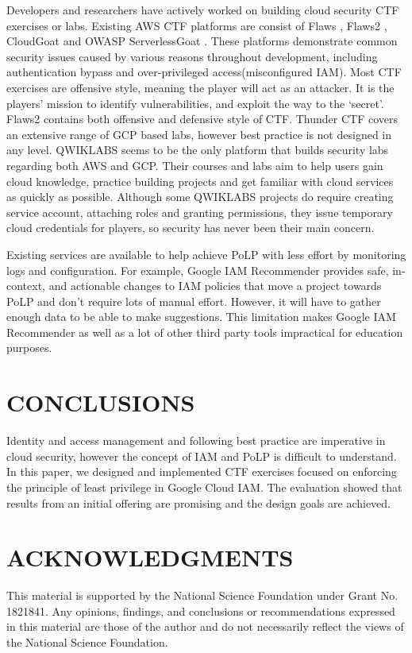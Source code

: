 \documentclass[a4paper,twoside]{article}
\begin{document}
\noindent Developers and researchers have actively worked on building cloud security CTF exercises or labs. Existing AWS CTF platforms are consist of  Flaws \cite{flaws}, Flaws2 \cite{flaws2}, CloudGoat \cite{cloudgoat} and OWASP ServerlessGoat \cite{serverlessgoat}. These platforms demonstrate common security issues caused by various reasons throughout development, including authentication bypass and over-privileged access(misconfigured IAM). Most CTF exercises are offensive style, meaning the player will act as an attacker. It is the players’ mission to identify vulnerabilities, and exploit the way to the ‘secret’. Flaws2 contains both offensive and defensive style of CTF. Thunder CTF \cite{thunder-ctf} covers an extensive range of GCP based labs, however best practice is not designed in any level. QWIKLABS \cite{QWIKLABS} seems to be the only platform that builds security labs regarding both AWS and GCP. Their courses and labs aim to help users gain cloud knowledge, practice building projects and get familiar with cloud services as quickly as possible. Although some QWIKLABS projects do require creating service account, attaching roles and granting permissions, they issue temporary cloud credentials for players, so security has never been their main concern.

Existing services are available to help achieve PoLP with less effort by monitoring logs and configuration. For example, Google IAM Recommender \cite{GoogleLstRec} provides safe, in-context, and actionable changes to IAM policies that move a project towards PoLP and don’t require lots of manual effort. However, it will have to gather enough data to be able to make suggestions. This limitation makes Google IAM Recommender as well as a lot of other third party tools impractical for education purposes.

\section{\uppercase{Conclusions}}
\label{sec:conclusion}

\noindent Identity and access management and following best practice are imperative in cloud security, however the concept of IAM and PoLP is difficult to understand. In this paper, we designed and implemented CTF exercises focused on enforcing the principle of least privilege in Google Cloud IAM. The evaluation showed that results from an initial offering are promising and the design goals are achieved. 

\section*{\uppercase{Acknowledgments}}
\noindent This material is supported by the National Science Foundation under Grant No. 1821841. Any
opinions, findings, and conclusions or recommendations expressed in this material are those of the author and do not necessarily reflect the views of the National Science Foundation.



{\small
}
\end{document}
